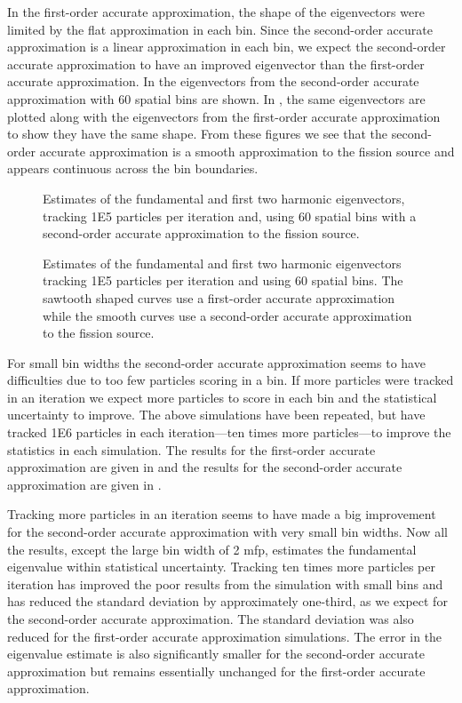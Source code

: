 In the first-order accurate approximation, the shape of the eigenvectors were limited by the flat approximation in each bin.  Since the second-order accurate approximation is a linear approximation in each bin, we expect the second-order accurate approximation to have an improved eigenvector than the first-order accurate approximation.  In  the eigenvectors from the second-order accurate approximation with 60 spatial bins are shown.  In , the same eigenvectors are plotted along with the eigenvectors from the first-order accurate approximation to show they have the same shape.  From these figures we see that the second-order accurate approximation is a smooth approximation to the fission source and appears continuous across the bin boundaries.
\begin{sidewaysfigure} \centering
    
    \caption{Estimates of the fundamental and first two harmonic eigenvectors, tracking 1E5 particles per iteration and, using 60 spatial bins with a second-order accurate approximation to the fission source.}
    \label{fig:LinearVectors}
\end{sidewaysfigure}

\begin{sidewaysfigure} \centering
    
    \caption{Estimates of the fundamental and first two harmonic eigenvectors tracking 1E5 particles per iteration and using 60 spatial bins.  The sawtooth shaped curves use a  first-order accurate approximation while the smooth curves use a second-order accurate approximation to the fission source.}
    \label{fig:SpatialDiscretizationVectors}
\end{sidewaysfigure}

For small bin widths the second-order accurate approximation seems to have difficulties due to too few particles scoring in a bin.  If more particles were tracked in an iteration we expect more particles to score in each bin and the statistical uncertainty to improve.  The above simulations have been repeated, but have tracked 1E6 particles in each iteration---ten times more particles---to improve the statistics in each simulation.  The results for the first-order accurate approximation are given in  and the results for the second-order accurate approximation  are given in .

Tracking more particles in an iteration seems to have made a big improvement for the second-order accurate approximation with very small bin widths.  Now all the results, except the large bin width of 2 mfp, estimates the fundamental eigenvalue within statistical uncertainty.  Tracking ten times more particles per iteration has improved the poor results from the simulation with small bins and has reduced the standard deviation by approximately one-third, as we expect for the second-order accurate approximation.  The standard deviation was also reduced for the first-order accurate approximation simulations.  The error in the eigenvalue estimate is also significantly smaller for the second-order accurate approximation but remains essentially unchanged for the first-order accurate approximation.

